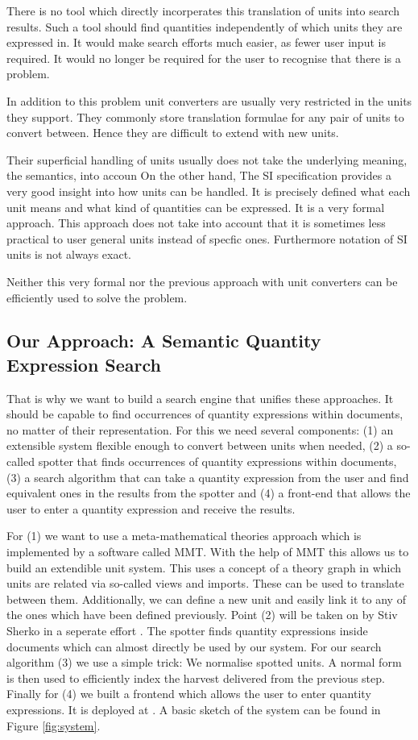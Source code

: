 There is no tool which directly incorperates this translation of units into search results. Such a tool should find quantities independently of which units they are expressed in. It would make search efforts much easier, as fewer user input is required. It would no longer be required for the user to recognise that there is a problem.

In addition to this problem unit converters are usually very restricted in the units they support. They commonly store translation formulae for any pair of units to convert between. Hence they are difficult to extend with new units.

Their superficial handling of units usually does not take the underlying meaning, the semantics, into accoun On the other hand, The SI specification \cite{sispec} provides a very good insight into how units can be handled. It is precisely defined what each unit means and what kind of quantities can be expressed. It is a very formal approach. This approach does not take into account that it is sometimes less practical to user general units instead of specfic ones. Furthermore notation of SI units is not always exact.

Neither this very formal nor the previous approach with unit converters can be efficiently used to solve the problem.

\subsection{Our Approach: A Semantic Quantity Expression Search}

That is why we want to build a search engine that unifies these approaches. It should be capable to find occurrences of quantity expressions within documents, no matter of their representation. For this we need several components: (1) an extensible system flexible enough to convert between units when needed, (2) a so-called spotter that finds occurrences of quantity expressions within documents, (3) a search algorithm that can take a quantity expression from the user and find equivalent ones in the results from the spotter and (4) a front-end that allows the user to enter a quantity expression and receive the results.

For (1) we want to use a meta-mathematical theories approach which is implemented by a software called MMT. With the help of MMT this allows us to build an extendible unit system. This uses a concept of a theory graph in which units are related via so-called views and imports. These can be used to translate between them. Additionally, we can define a new unit and easily link it to any of the ones which have been defined previously. Point (2) will be taken on by Stiv Sherko in a seperate effort \cite{thesis:sharko}. The spotter finds quantity expressions inside documents which can almost directly be used by our system. For our search algorithm (3) we use a simple trick: We normalise spotted units. A normal form is then used to efficiently index the harvest delivered from the previous step. Finally for (4) we built a frontend which allows the user to enter quantity expressions. It is deployed at \cite{self:sqesdemo}. A basic sketch of the system can be found in Figure \ref{fig:system}.

